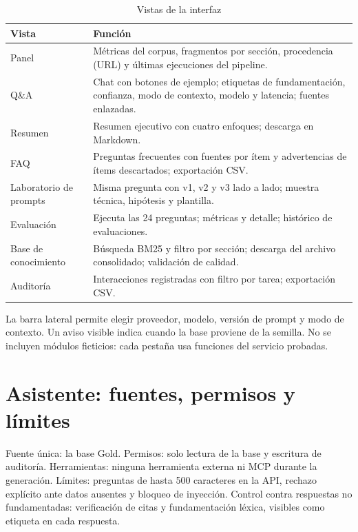 \begin{table}[H]\centering\small
\caption{Vistas de la interfaz}\label{tab:vistas}
\begin{tabularx}{\linewidth}{@{}l X@{}}\toprule
Vista & Función\\\midrule
Panel & Métricas del corpus, fragmentos por sección, procedencia (URL) y últimas ejecuciones del pipeline.\\
Q\&A & Chat con botones de ejemplo; etiquetas de fundamentación, confianza, modo de contexto, modelo y latencia; fuentes enlazadas.\\
Resumen & Resumen ejecutivo con cuatro enfoques; descarga en Markdown.\\
FAQ & Preguntas frecuentes con fuentes por ítem y advertencias de ítems descartados; exportación CSV.\\
Laboratorio de prompts & Misma pregunta con v1, v2 y v3 lado a lado; muestra técnica, hipótesis y plantilla.\\
Evaluación & Ejecuta las 24 preguntas; métricas y detalle; histórico de evaluaciones.\\
Base de conocimiento & Búsqueda BM25 y filtro por sección; descarga del archivo consolidado; validación de calidad.\\
Auditoría & Interacciones registradas con filtro por tarea; exportación CSV.\\\bottomrule
\end{tabularx}
\end{table}
La barra lateral permite elegir proveedor, modelo, versión de prompt y modo de contexto. Un aviso visible indica
cuando la base proviene de la semilla. No se incluyen módulos ficticios: cada pestaña usa funciones del servicio
probadas.

\section{Asistente: fuentes, permisos y límites}
Fuente única: la base Gold. Permisos: solo lectura de la base y escritura de auditoría. Herramientas: ninguna
herramienta externa ni MCP durante la generación. Límites: preguntas de hasta 500 caracteres en la API, rechazo
explícito ante datos ausentes y bloqueo de inyección. Control contra respuestas no fundamentadas: verificación de
citas y fundamentación léxica, visibles como etiqueta en cada respuesta.

